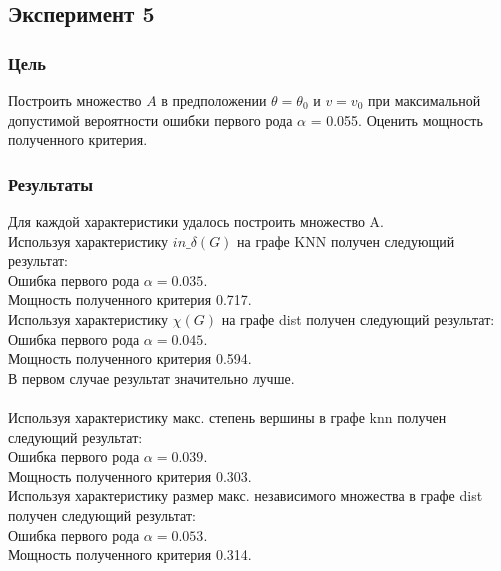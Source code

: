 \documentclass[a4paper, 12pt]{article}
\begin{document}
\subsection{Эксперимент 5}
\subsubsection{Цель}
Построить множество $A$ в предположении $\theta = \theta_0$ и $v = v_0$ при максимальной допустимой вероятности ошибки первого рода $\alpha$ = 0.055.
Оценить мощность полученного критерия.
\subsubsection{Результаты}
Для каждой характеристики удалось построить множество A.\\
Используя характеристику $in\_\delta(G)$ на графе KNN получен следующий результат:\\
Ошибка первого рода $\alpha = 0.035.$\\
Мощность полученного критерия 0.717.\\
Используя характеристику $\chi(G)$ на графе dist получен следующий результат:\\
Ошибка первого рода $\alpha = 0.045.$\\
Мощность полученного критерия 0.594.\\
В первом случае результат значительно лучше.\\

\\

Используя характеристику макс. степень вершины в графе knn получен следующий результат:\\
Ошибка первого рода $\alpha = 0.039.$\\
Мощность полученного критерия 0.303.\\

Используя характеристику размер макс. независимого множества в графе dist получен следующий результат:\\
Ошибка первого рода $\alpha = 0.053.$\\
Мощность полученного критерия 0.314.\\
\end{document}
